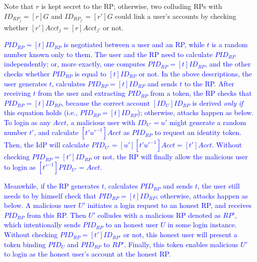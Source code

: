 Note that $r$ is kept secret to the RP; otherwise, two colluding RPs with $ID_{RP_j} = [r]G$ and $ID_{RP_{j'}} = [r']G$ could link a user's accounts by checking whether $[r']Acct_j = [r]Acct_{j'}$ or not.

\textcolor{blue}{$PID_{RP} = [t]ID_{RP}$ is negotiated between a user and an RP,
    while $t$ is a random number known only to them.
The user and the RP need to calculate $PID_{RP}$ independently; or, more exactly,
 one computes $PID_{RP} = [t]ID_{RP}$, and the other checks whether $PID_{RP}$ is equal to $[t]ID_{RP}$ or not.
In the above descriptions,
    the user generates $t$, calculates $PID_{RP} = [t]ID_{RP}$ and sends $t$ to the RP.
After receiving $t$ from the user and extracting $PID_{RP}$ from a token,
    the RP checks that $PID_{RP} = [t]ID_{RP}$,
        because the correct account $[ID_U]ID_{RP}$ is derived \emph{only if} this equation holds (i.e., $PID_{RP} = [t]ID_{RP}$);
        otherwise, attacks happen as below.
To login as any $Acct$,
        a malicious user with $ID_{U'} = u'$ might generate a random number $t'$,
            and calculate $[t'u'^{-1}]Acct$ as $PID_{RP}$ to request an identity token.
Then, the IdP will calculate $PID_{U'} = [u'][t'u'^{-1}]Acct = [t']Acct$.
Without checking $PID_{RP} = [t']ID_{RP}$ or not,
        the RP will finally allow the malicious user to login as $[t'^{-1}]PID_{U'} = Acct$.}


\textcolor{blue}{Meanwhile,
    if the RP generates $t$, calculates $PID_{RP}$ and sends $t$,
the user still needs to by himself check that $PID_{RP} = [t]ID_{RP}$;
    otherwise, attacks happen as below.
A malicious user $U'$ initiates a login request to an honest RP,
    and receives $PID_{RP}$ from this RP.
Then $U'$ colludes with a malicious RP denoted as $RP'$,
    which intentionally sends $PID_{RP}$ to an honest user $U$ in some login instance.
Without checking $PID_{RP} = [t']ID_{RP'}$ or not,
    this honest user will present a token binding $PID_U$ and $PID_{RP}$ to $RP'$.
Finally, this token enables malicious $U'$ to login as the honest user's account at the honest RP.}




